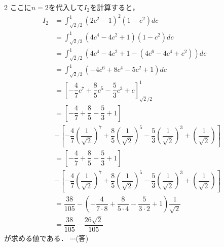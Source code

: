 \documentclass[../../main.tex]{subfiles}
\begin{document}
\begin{multicols}{2}
  ここに$n=2$を代入して$I_2$を計算すると，
  \begin{align}
    I_2
    & = \int_{\sqrt{2}/2}^{1} \left(2c^2 - 1\right)^{2} \left(1-c^2\right) dc                                                                                                                \\
    & = \int_{\sqrt{2}/2}^{1} \left(4c^4 - 4c^2 + 1\right)\left(1-c^2\right) dc                                                                                                               \\
    & = \int_{\sqrt{2}/2}^{1} \left(4c^4 - 4c^2 + 1 - (4c^6 - 4c^4 +c^2)\right) dc                                                                                                                  \\
    & = \int_{\sqrt{2}/2}^{1} \left(-4c^6 + 8c^4 - 5c^2 + 1 \right) dc                                                                                                                              \\
    & = \left[-\dfrac{4}{7}c^7 + \dfrac{8}{5}c^5 - \dfrac{5}{3}c^3 + c \right]_{\sqrt{2}/2}^{1}                                                                                                        \\
    & = \left[-\dfrac{4}{7} + \dfrac{8}{5} - \dfrac{5}{3} + 1 \right]                                                                                                                                  \\
    & - \left[-\dfrac{4}{7}\left(\dfrac{1}{\sqrt{2}}\right)^7 + \dfrac{8}{5}\left(\dfrac{1}{\sqrt{2}}\right)^5 - \dfrac{5}{3}\left(\dfrac{1}{\sqrt{2}}\right)^3 + \left(\dfrac{1}{\sqrt{2}}\right) \right] \\
    & = \left[-\dfrac{4}{7} + \dfrac{8}{5} - \dfrac{5}{3} + 1 \right]                                                                                                                                  \\
    & - \left[-\dfrac{4}{7}\left(\dfrac{1}{\sqrt{2}}\right)^7 + \dfrac{8}{5}\left(\dfrac{1}{\sqrt{2}}\right)^5 - \dfrac{5}{3}\left(\dfrac{1}{\sqrt{2}}\right)^3 + \left(\dfrac{1}{\sqrt{2}}\right) \right] \\
    & = \dfrac{38}{105} - \left(-\dfrac{4}{7\cdot 8}+\dfrac{8}{5\cdot 4}- \dfrac{5}{3\cdot 2}+1\right) \dfrac{1}{\sqrt{2}}                                                                               \\
    & = \dfrac{38}{105} - \dfrac{26\sqrt{2}}{105}
  \end{align}
  が求める値である．  $\cdots$(答)


\end{multicols}
\end{document}
